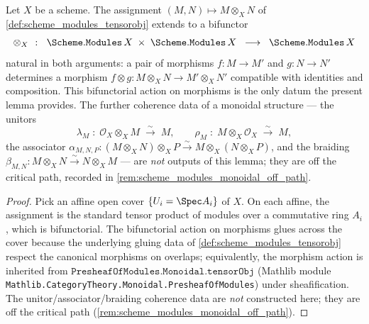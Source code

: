 \begin{lemma}\leanok
  \label{lem:scheme_modules_tensorobj_functoriality}
  Let \(X\) be a scheme. The assignment
  \((M, N) \mapsto M \otimes_X N\) of
  \cref{def:scheme_modules_tensorobj} extends to a bifunctor
  \[
    \otimes_X \;\;\colon\;\; \Scheme.\mathtt{Modules}\,X \;\times\;
                          \Scheme.\mathtt{Modules}\,X \;\;\longrightarrow\;\;
                          \Scheme.\mathtt{Modules}\,X
  \]
  natural in both arguments: a pair of morphisms
  \(f : M \to M'\) and \(g : N \to N'\) determines a morphism
  \(f \otimes g : M \otimes_X N \to M' \otimes_X N'\) compatible with
  identities and composition. This bifunctorial action on morphisms is
  the only datum the present lemma provides. The further coherence data
  of a monoidal structure --- the unitors
  \[
    \lambda_M \;\colon\; \mathcal{O}_X \otimes_X M \;\xrightarrow{\sim}\; M,
    \qquad
    \rho_M \;\colon\; M \otimes_X \mathcal{O}_X \;\xrightarrow{\sim}\; M,
  \]
  the associator
  \(\alpha_{M, N, P} : (M \otimes_X N) \otimes_X P \xrightarrow{\sim}
   M \otimes_X (N \otimes_X P)\), and the braiding
  \(\beta_{M, N} : M \otimes_X N \xrightarrow{\sim} N \otimes_X M\) ---
  are \emph{not} outputs of this lemma; they are off the critical path,
  recorded in \cref{rem:scheme_modules_monoidal_off_path}.
\end{lemma}

\begin{proof}
  \leanok
  Pick an affine open cover \(\{U_i = \Spec A_i\}\) of \(X\). On each
  affine, the assignment is the standard tensor product of modules over a
  commutative ring \(A_i\), which is bifunctorial. The bifunctorial action
  on morphisms glues across the cover because the underlying gluing data of
  \cref{def:scheme_modules_tensorobj} respect the canonical morphisms on
  overlaps; equivalently, the morphism action is inherited from
  \(\mathtt{PresheafOfModules.Monoidal.tensorObj}\) (Mathlib module
  \texttt{Mathlib.CategoryTheory.Monoidal.PresheafOfModules}) under
  sheafification. The unitor/associator/braiding coherence data are
  \emph{not} constructed here; they are off the critical path
  (\cref{rem:scheme_modules_monoidal_off_path}).
\end{proof}


